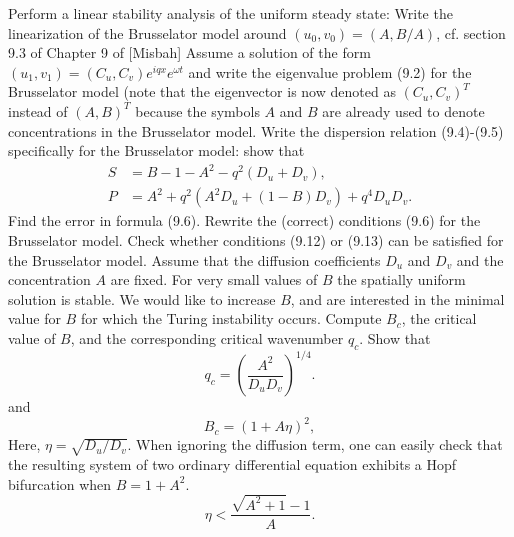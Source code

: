 \begin{Exercise}[name=Brusselator model]
\noindent
Perform a linear stability analysis of the uniform steady state:
\Question Write the linearization of the Brusselator model around $(u_0,v_0) = (A, B/A)$, cf. section 9.3 of Chapter 9 of [Misbah]
\Question Assume a solution of the form $(u_1, v_1) = (C_u, C_v) e^{iqx} e^{\omega t}$ and write the eigenvalue problem (9.2) for the Brusselator model 
(note that the eigenvector is now denoted as $(C_u, C_v)^T$ instead of $(A, B)^T$ because the symbols $A$ and $B$ are already used to denote concentrations in the Brusselator model. 
\Question Write the dispersion relation (9.4)-(9.5) specifically for the Brusselator model: show that 
\begin{align*}
S &= B - 1 - A^2 -q^2(D_u+D_v),\\
P &= A^2 + q^2(A^2 D_u + (1-B) D_v)+q^4D_uD_v.
\end{align*}
\Question Find the error in formula (9.6). Rewrite the (correct) conditions (9.6) for the Brusselator model.
Check whether conditions (9.12) or (9.13) can be satisfied for the Brusselator model.
\Question Assume that the diffusion coefficients $D_u$ and $D_v$ and the concentration $A$ are fixed.
For very small values of $B$ the spatially uniform solution is stable.  We would like to increase $B$,
 and are interested in the minimal value for $B$ for which the Turing instability occurs.
Compute $B_c$, the critical value of $B$, and the corresponding critical wavenumber $q_c$.
Show that 
\[q_c=\left(\frac{A^2}{D_uD_v}\right)^{1/4}.\]
and
\[B_c=(1+A\eta)^2,\] 
Here, $\eta=\sqrt{D_u/D_v}$.
\Question When ignoring the diffusion term, one can easily check that the resulting system of two ordinary differential equation
exhibits a Hopf bifurcation when $B=1+A^2$.  
\[\eta < \frac{\sqrt{A^2+1}-1}{A}.\]

\end{Exercise}
